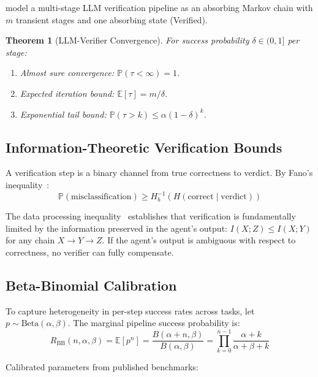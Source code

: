 \documentclass[11pt, a4paper, logo, copyright]{googledeepmind}
\newtheorem{theorem}{Theorem}[section]
\newcommand{\E}{\mathbb{E}}
\newcommand{\Prob}{\mathbb{P}}
\begin{document}
\begin{appendices}
\citet{chen2024fourdelta} model a multi-stage LLM verification pipeline as an absorbing Markov chain with $m$ transient stages and one absorbing state (Verified).

\begin{theorem}[LLM-Verifier Convergence]
For success probability $\delta \in (0,1]$ per stage:
\begin{enumerate}
\item \emph{Almost sure convergence}: $\Prob(\tau < \infty) = 1$.
\item \emph{Expected iteration bound}: $\E[\tau] = m/\delta$.
\item \emph{Exponential tail bound}: $\Prob(\tau > k) \leq \alpha(1 - \delta)^k$.
\end{enumerate}
\end{theorem}

\subsection{Information-Theoretic Verification Bounds}

A verification step is a binary channel from true correctness to verdict.
By Fano's inequality~\citep{fano1961transmission}:
\begin{equation}
\Prob(\text{misclassification}) \geq H_b^{-1}(H(\text{correct} \mid \text{verdict}))
\end{equation}

The data processing inequality~\citep{cover2006elements} establishes that verification is fundamentally limited by the information preserved in the agent's output: $I(X; Z) \leq I(X; Y)$ for any chain $X \to Y \to Z$.
If the agent's output is ambiguous with respect to correctness, no verifier can fully compensate.

\subsection{Beta-Binomial Calibration}

To capture heterogeneity in per-step success rates across tasks, let $p \sim \text{Beta}(\alpha, \beta)$.
The marginal pipeline success probability is:
\begin{equation}
R_{\text{BB}}(n, \alpha, \beta) = \E[p^n] = \frac{B(\alpha + n, \beta)}{B(\alpha, \beta)} = \prod_{k=0}^{n-1} \frac{\alpha + k}{\alpha + \beta + k}
\end{equation}

Calibrated parameters from published benchmarks:


\end{appendices}
\end{document}
